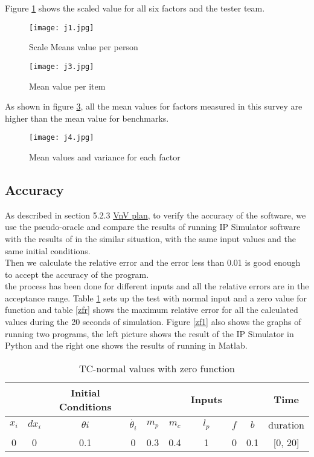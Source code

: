 \documentclass[12pt, titlepage]{article}
\begin{document}
Figure \ref{j1} shows the scaled value for all six factors and the tester team.

\begin{figure}[H]
\begin{center}
\texttt{[image: j1.jpg]}
 \caption{Scale Means value per person}
 \label{j1}
 \end{center}
 \end{figure}


 \begin{figure}[H]
\begin{center}
\texttt{[image: j3.jpg]}
 \caption{Mean value per item}
 \label{j3}
 \end{center}
 \end{figure}
 As shown in figure \ref{j4}, all the mean values for factors measured in this survey are higher than the mean value for benchmarks.
 \begin{figure}[H]
\begin{center}
\texttt{[image: j4.jpg]}
 \caption{Mean values and variance for each factor}
 \label{j4}
 \end{center}
 \end{figure}
\newpage
\subsection{Accuracy \label{accuracy}}
As described in section 5.2.3 \href{https://github.com/MinMah23/CAS741-Project/tree/main/docs/VnVPlan}{VnV plan}, to verify the accuracy of the software, we use the pseudo-oracle and compare the results of running IP Simulator software with the results of \cite{al-khazraji_2022} in the similar situation, with the same input values and the same initial conditions.\\
Then we calculate the relative error and the error less than 0.01 is good enough to accept the accuracy of the program.\\
the process has been done for different inputs and all the relative errors are in the acceptance range. Table \ref{zf} sets up the test with normal input and a zero value for function and table \ref{zfr} shows the maximum relative error for all the calculated values during the 20 seconds of simulation. Figure \ref{zf1} also shows the graphs of running two programs, the left picture shows the result of the IP Simulator in Python and the right one shows the results of running \cite{al-khazraji_2022} in Matlab.


\begin{table}[ht]
\caption{TC-normal values with zero function} \label{zf}
\vspace*{2mm}
\centering
 \begin{tabular}{|c c c c|c c c c c|c|} 
 \hline
&&\textbf{Initial Conditions}& &  &  &  \textbf{Inputs} &  &&\textbf{Time}  \\ \hline
$x_i$&$dx_i$&$\theta{i}$&$\dot{\theta_{i}}$ & $m_p$ & $m_c$ & $l_p$ & $f$ & $b$  & duration \\ \hline
0 & 0 & 0.1 & 0 & 0.3 & 0.4 & 1 & 0 & 0.1 &[0, 20]\\
 \hline
\end{tabular}
\end{table}	
\end{document}

